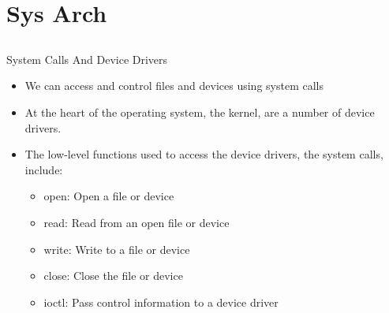 \documentclass{beamer}
\begin{document}

%
%


\section{Sys Arch}
\subsection{}

\begin{frame}{System Calls And Device Drivers}
\begin{itemize}
\item We can access and control files and devices using system calls
\item At the heart of the operating system, the kernel, are a number of device drivers.
\item The low-level functions used to access the device drivers, the system calls, include:
\begin{itemize}
\item open: Open a file or device
\item read: Read from an open file or device
\item write: Write to a file or device
\item close: Close the file or device
\item ioctl: Pass control information to a device driver
\end{itemize}
\end{itemize}
\end{frame}
\end{document}
